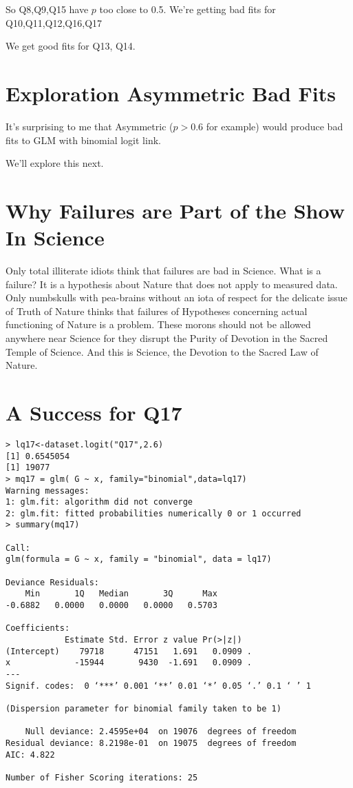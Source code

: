 \documentclass{amsart}
\begin{document}
So Q8,Q9,Q15 have $p$ too close to 0.5.  We're getting bad fits for Q10,Q11,Q12,Q16,Q17

We get good fits for Q13, Q14.

\section{Exploration Asymmetric Bad Fits}

It's surprising to me that Asymmetric ($p>0.6$ for example) would produce bad fits to GLM with binomial logit link.

We'll explore this next.

\section{Why Failures are Part of the Show In Science}

Only total illiterate idiots think that failures are bad in Science.  What is a failure?  It is a hypothesis about Nature that does not apply to measured data. Only numbskulls with pea-brains without an iota of respect for the delicate issue of Truth of Nature thinks that failures of Hypotheses concerning actual functioning of Nature is a problem.  These morons should not be allowed anywhere near Science for they disrupt the Purity of Devotion in the Sacred Temple of Science.  And this is Science, the Devotion to the Sacred Law of Nature.

\section{A Success for Q17}

\begin{verbatim}
> lq17<-dataset.logit("Q17",2.6)
[1] 0.6545054
[1] 19077
> mq17 = glm( G ~ x, family="binomial",data=lq17)
Warning messages:
1: glm.fit: algorithm did not converge 
2: glm.fit: fitted probabilities numerically 0 or 1 occurred 
> summary(mq17)

Call:
glm(formula = G ~ x, family = "binomial", data = lq17)

Deviance Residuals: 
    Min       1Q   Median       3Q      Max  
-0.6882   0.0000   0.0000   0.0000   0.5703  

Coefficients:
            Estimate Std. Error z value Pr(>|z|)  
(Intercept)    79718      47151   1.691   0.0909 .
x             -15944       9430  -1.691   0.0909 .
---
Signif. codes:  0 ‘***’ 0.001 ‘**’ 0.01 ‘*’ 0.05 ‘.’ 0.1 ‘ ’ 1

(Dispersion parameter for binomial family taken to be 1)

    Null deviance: 2.4595e+04  on 19076  degrees of freedom
Residual deviance: 8.2198e-01  on 19075  degrees of freedom
AIC: 4.822

Number of Fisher Scoring iterations: 25
\end{verbatim}
\end{document}
